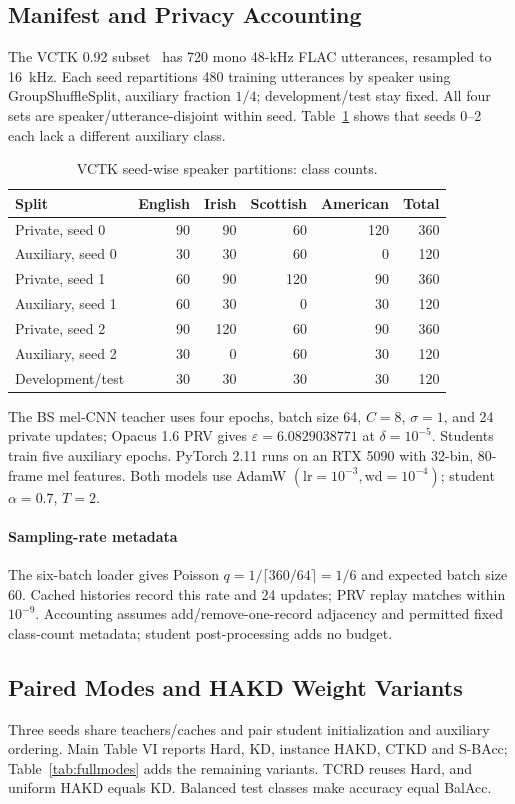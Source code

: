 \documentclass[journal]{IEEEtran}
\begin{document}
\subsection{Manifest and Privacy Accounting}
The VCTK 0.92 subset~\cite{veaux2017vctk} has 720 mono 48-kHz FLAC utterances, resampled to 16~kHz. Each seed repartitions 480 training utterances by speaker using GroupShuffleSplit, auxiliary fraction $1/4$; development/test stay fixed. All four sets are speaker/utterance-disjoint within seed. Table~\ref{tab:manifest} shows that seeds 0--2 each lack a different auxiliary class.
\begin{table}[t]
\centering\footnotesize\setlength{\tabcolsep}{3.4pt}
\caption{VCTK seed-wise speaker partitions: class counts.}
\label{tab:manifest}
\begin{tabular}{lrrrrr}\toprule
Split & English & Irish & Scottish & American & Total\\\midrule
Private, seed 0 &90&90&60&120&360\\
Auxiliary, seed 0 &30&30&60&0&120\\
Private, seed 1 &60&90&120&90&360\\
Auxiliary, seed 1 &60&30&0&30&120\\
Private, seed 2 &90&120&60&90&360\\
Auxiliary, seed 2 &30&0&60&30&120\\
Development/test &30&30&30&30&120\\\bottomrule
\end{tabular}
\end{table}
The BS mel-CNN teacher uses four epochs, batch size 64, $C=8$, $\sigma=1$, and 24 private updates; Opacus 1.6 PRV gives $\varepsilon=6.0829038771$ at $\delta=10^{-5}$. Students train five auxiliary epochs. PyTorch 2.11 runs on an RTX 5090 with 32-bin, 80-frame mel features. Both models use AdamW $(\mathrm{lr}=10^{-3},\mathrm{wd}=10^{-4})$; student $\alpha=0.7$, $T=2$.

\paragraph*{Sampling-rate metadata}
The six-batch loader gives Poisson $q=1/\lceil360/64\rceil=1/6$ and expected batch size 60. Cached histories record this rate and 24 updates; PRV replay matches within $10^{-9}$. Accounting assumes add/remove-one-record adjacency and permitted fixed class-count metadata; student post-processing adds no budget.

\subsection{Paired Modes and HAKD Weight Variants}
Three seeds share teachers/caches and pair student initialization and auxiliary ordering. Main Table VI reports Hard, KD, instance HAKD, CTKD and S-BAcc; Table~\ref{tab:fullmodes} adds the remaining variants. TCRD reuses Hard, and uniform HAKD equals KD. Balanced test classes make accuracy equal BalAcc.
\end{document}
